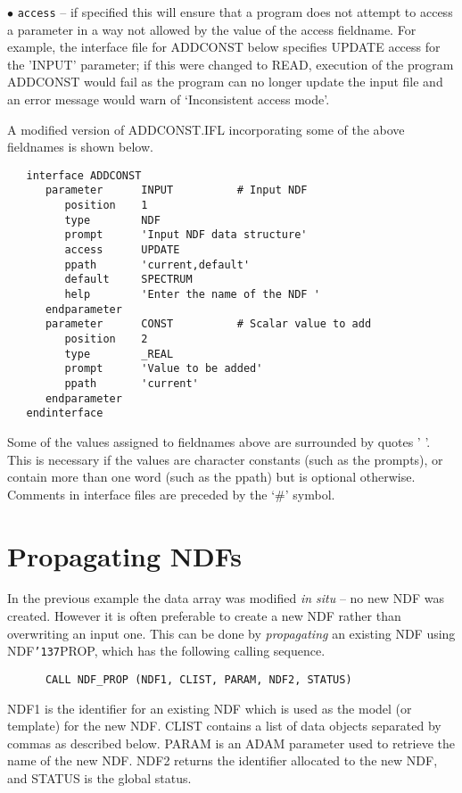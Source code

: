 \documentclass[twoside,11pt]{article}
\renewcommand{\_}{{\tt\char'137}}
\newcommand{\xlabel}[1]{}
\begin{document}
\begin{description}
\item{$\bullet$ \tt access} -- if specified this will ensure that a program
does not attempt to access a parameter in a way not allowed by the
value of the access fieldname.
For example, the interface file for ADDCONST below specifies UPDATE access
for the 'INPUT' parameter;
if this
were changed to READ, execution of the program ADDCONST would fail as the
program can no longer update the input file and
an error message would warn of
`Inconsistent access mode'.
\end{description}
A modified version of ADDCONST.IFL incorporating some of the above
fieldnames is shown below.
\begin{verbatim}
   interface ADDCONST
      parameter      INPUT          # Input NDF
         position    1
         type        NDF
         prompt      'Input NDF data structure'
         access      UPDATE
         ppath       'current,default'
         default     SPECTRUM
         help        'Enter the name of the NDF '
      endparameter
      parameter      CONST          # Scalar value to add
         position    2
         type        _REAL
         prompt      'Value to be added'
         ppath       'current'
      endparameter
   endinterface
\end{verbatim}
Some of the values assigned to fieldnames above are surrounded by quotes ' '.
This is necessary if the values are character constants (such as the prompts),
or contain more than one word (such as the ppath)  but is optional otherwise.
Comments in interface files are preceded by the `\#' symbol.

\newpage
\section{Propagating NDFs\label{prop}\xlabel{propagating_ndfs}}

In the previous  example the data array was modified {\sl in situ} --
no new NDF was created.
However it is often preferable to create a new NDF rather than overwriting an
input one.
This can be done by {\sl propagating\/} an existing NDF using
NDF\_PROP, which has the following calling sequence.
\begin{verbatim}
      CALL NDF_PROP (NDF1, CLIST, PARAM, NDF2, STATUS)
\end{verbatim}
NDF1 is the identifier for an existing NDF which is used
as the model (or template) for the new NDF.
CLIST contains a list of data objects separated by commas as described
below.
PARAM is an ADAM parameter used to retrieve the name of the new  NDF.
NDF2 returns the identifier allocated to the new NDF, and STATUS is the global
status.
\end{document}
